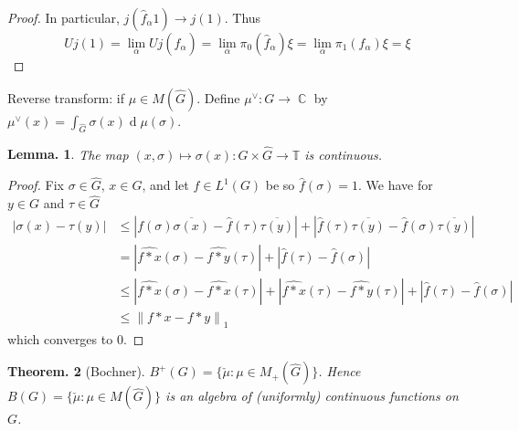 \documentclass[11pt, a4paper]{memoir}
\DeclareMathOperator{\C}{{\mathbb{C}}}
\newcommand{\norm}[1]{\ensuremath{\left\lVert#1\right\rVert}}
\theoremstyle{change}
\newtheorem{theorem}{Theorem.}[section]
\newtheorem{lemma}[theorem]{Lemma.}
\theoremstyle{plain}
\theoremstyle{nonumberplain}
\newtheorem{proof}{Proof}
\renewcommand{\d}[1]{\ensuremath{\operatorname{d}\!{#1}}}
\numberwithin{equation}{section}
\begin{document}
\begin{proof}
    In particular, $j(\hat{f}_\alpha 1)\to j(1)$.
    Thus
    \begin{equation*}
        Uj(1)=\lim_\alpha Uj(\hat{f}_\alpha)=\lim_\alpha\pi_0(\hat{f}_\alpha)\xi=\lim_\alpha\pi_1(f_\alpha)\xi=\xi
    \end{equation*}
\end{proof}
Reverse transform: if $\mu\in M(\widehat{G})$.
Define $\mu^\vee:G\to\C$ by $\mu^\vee(x)=\int_{\widehat{G}}\sigma(x)\d{\mu(\sigma)}$.
\begin{lemma}
    The map $(x,\sigma)\mapsto\sigma(x):G\times\widehat{G}\to\mathbb{T}$ is continuous.
\end{lemma}
\begin{proof}
    Fix $\sigma\in\widehat{G}$, $x\in G$, and let $f\in L^1(G)$ be so $\widehat{f}(\sigma)=1$.
    We have for $y\in G$ and $\tau\in\widehat{G}$
    \begin{align*}
        |\sigma(x)-\tau(y)| &\leq|f(\sigma)\overline{\sigma(x)}-\hat{f}(\tau)\overline{\tau(y)}| + |\hat{f}(\tau)\overline{\tau(y)}-\hat{f}(\sigma)\overline{\tau(y)}|\\
                            &= |\widehat{f*x}(\sigma)-\widehat{f*y}(\tau)|+|\hat{f}(\tau)-\hat{f}(\sigma)|\\
                            &\leq |\widehat{f*x}(\sigma)-\widehat{f*x}(\tau)|+|\widehat{f*x}(\tau)-\widehat{f*y}(\tau)|+|\hat{f}(\tau)-\hat{f}(\sigma)|\\
                            &\leq \norm{f*x-f*y}_1
    \end{align*}
    which converges to $0$.
\end{proof}
\begin{theorem}[Bochner]
    $B^+(G)=\{\check\mu:\mu\in M_+(\widehat{G})\}$.
    Hence $B(G)=\{\check{\mu}:\mu\in M(\widehat{G})\}$ is an algebra of (uniformly) continuous functions on $G$.
\end{theorem}
\end{document}
